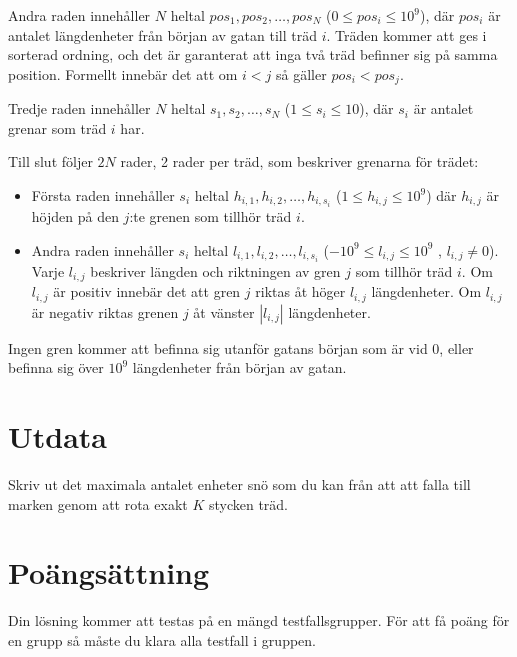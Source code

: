Andra raden innehåller $N$ heltal $pos_1, pos_2, \dots, pos_N$ ($0 \leq pos_i \leq 10^9$), där $pos_i$ är antalet längdenheter från början av gatan till träd $i$. 
Träden kommer att ges i sorterad ordning, och det är garanterat att inga två träd befinner sig på samma position. Formellt innebär det att om $i<j$ så gäller $pos_i < pos_j$.

Tredje raden innehåller $N$ heltal $s_1, s_2, \dots, s_N$ ($1 \leq s_i \leq 10$), där $s_i$ är antalet grenar som träd $i$ har. 

Till slut följer $2N$ rader, 2 rader per träd, som beskriver grenarna för trädet:
\begin{itemize}
  \item Första raden innehåller $s_i$ heltal $h_{i,1}, h_{i,2}, \dots, h_{i,s_i}$ ($1 \leq h_{i,j} \leq 10^9$) där $h_{i,j}$ är höjden på den $j$:te grenen som tillhör träd $i$. 
  \item Andra raden innehåller $s_i$ heltal $l_{i,1}, l_{i,2}, \dots, l_{i,s_i}$ ($-10^9 \leq l_{i,j} \leq 10^9$ , $l_{i,j} \neq 0$). 
  Varje $l_{i,j}$ beskriver längden och riktningen av gren $j$ som tillhör träd $i$. Om $l_{i,j}$ är positiv innebär det att gren $j$ riktas åt höger $l_{i,j}$ längdenheter. 
  Om $l_{i,j}$ är negativ riktas grenen $j$ åt vänster $|l_{i,j}|$ längdenheter.
\end{itemize}

Ingen gren kommer att befinna sig utanför gatans början som är vid $0$, eller befinna sig över $10^9$ längdenheter från början av gatan. 


\section*{Utdata}
Skriv ut det maximala antalet enheter snö som du kan från att att falla till marken genom att rota exakt $K$ stycken träd.

\section*{Poängsättning}
Din lösning kommer att testas på en mängd testfallsgrupper.
För att få poäng för en grupp så måste du klara alla testfall i gruppen.

